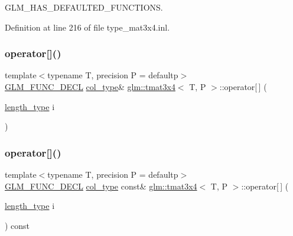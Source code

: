 G\+L\+M\+\_\+\+H\+A\+S\+\_\+\+D\+E\+F\+A\+U\+L\+T\+E\+D\+\_\+\+F\+U\+N\+C\+T\+I\+O\+NS. 



Definition at line 216 of file type\+\_\+mat3x4.\+inl.

\mbox{\label{structglm_1_1tmat3x4_adba2ef1be4b50bfaa63e5469310f1d87}} 
\subsubsection{\texorpdfstring{operator[]()}{operator[]()}\hspace{0.1cm}{\footnotesize\ttfamily [1/2]}}
{\footnotesize\ttfamily template$<$typename T, precision P = defaultp$>$ \\
\mbox{\hyperlink{setup_8hpp_ab2d052de21a70539923e9bcbf6e83a51}{G\+L\+M\+\_\+\+F\+U\+N\+C\+\_\+\+D\+E\+CL}} \mbox{\hyperlink{structglm_1_1tmat3x4_aa4c8d5353d59216a2f0566ce462fbc81}{col\+\_\+type}}\& \mbox{\hyperlink{structglm_1_1tmat3x4}{glm\+::tmat3x4}}$<$ T, P $>$\+::operator\mbox{[}$\,$\mbox{]} (\begin{DoxyParamCaption}\item[{\mbox{\hyperlink{structglm_1_1tmat3x4_ab857d16b90719de3b23d4fa423d20698}{length\+\_\+type}}}]{i }\end{DoxyParamCaption})}

\mbox{\label{structglm_1_1tmat3x4_af1fbec08dc06186ec67fb79ceffa3e25}} 
\subsubsection{\texorpdfstring{operator[]()}{operator[]()}\hspace{0.1cm}{\footnotesize\ttfamily [2/2]}}
{\footnotesize\ttfamily template$<$typename T, precision P = defaultp$>$ \\
\mbox{\hyperlink{setup_8hpp_ab2d052de21a70539923e9bcbf6e83a51}{G\+L\+M\+\_\+\+F\+U\+N\+C\+\_\+\+D\+E\+CL}} \mbox{\hyperlink{structglm_1_1tmat3x4_aa4c8d5353d59216a2f0566ce462fbc81}{col\+\_\+type}} const\& \mbox{\hyperlink{structglm_1_1tmat3x4}{glm\+::tmat3x4}}$<$ T, P $>$\+::operator\mbox{[}$\,$\mbox{]} (\begin{DoxyParamCaption}\item[{\mbox{\hyperlink{structglm_1_1tmat3x4_ab857d16b90719de3b23d4fa423d20698}{length\+\_\+type}}}]{i }\end{DoxyParamCaption}) const}



